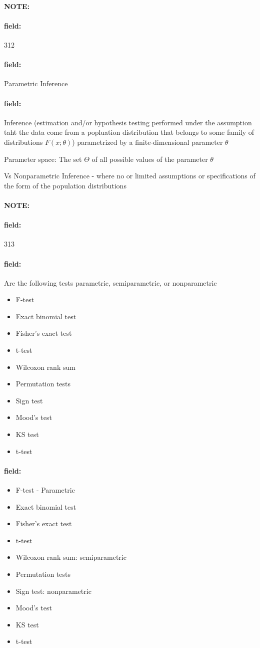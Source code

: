 \documentclass[12pt]{article}
\newenvironment{note}{\paragraph{NOTE:}}{}
\newenvironment{field}{\paragraph{field:}}{}
\begin{document}
\begin{note}
    \begin{field}
        \tiny 312
    \end{field}
    \begin{field}
        Parametric Inference
    \end{field}
    \begin{field}
        Inference (estimation and/or hypothesis testing performed under the assumption taht the data come from a popluation distribution that belongs to some family of distributions $F(x;\theta)$) parametrized by a finite-dimensional parameter $\theta$


        Parameter space: The set $\Theta$ of all possible values of the parameter $\theta$

        Vs Nonparametric Inference - where no or limited assumptions or specifications of the form of the population distributions
    \end{field}
\end{note}

\begin{note}
    \begin{field}
        \tiny 313
    \end{field}
    \begin{field}
        Are the following tests parametric, semiparametric, or nonparametric
        \begin{itemize}
          \item F-test
          \item Exact binomial test
          \item Fisher's exact test
          \item t-test
          \item Wilcoxon rank sum
          \item Permutation tests
          \item Sign test
          \item Mood's test
          \item KS test
          \item t-test
        \end{itemize}
    \end{field}
    \begin{field}
      \begin{itemize}
        \item F-test - Parametric
        \item Exact binomial test
        \item Fisher's exact test
        \item t-test
        \item Wilcoxon rank sum: semiparametric
        \item Permutation tests
        \item Sign test: nonparametric
        \item Mood's test
        \item KS test
        \item t-test
      \end{itemize}
    \end{field}
\end{note}
\end{document}
